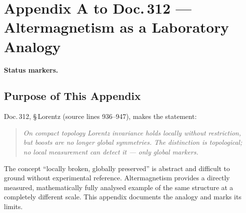 
\providecommand{\B}{}\renewcommand{\B}{\textbf{[B]}}
\providecommand{\K}{}\renewcommand{\K}{\textbf{[K]}}
\providecommand{\E}{}\renewcommand{\E}{\textbf{[E]}}
\providecommand{\SET}{}\renewcommand{\SET}{\textbf{[SETZUNG]}}


\chapter*{Appendix A to Doc.\,312 — Altermagnetism as a Laboratory Analogy}

\medskip\noindent\textbf{Status markers.}


\section*{Purpose of This Appendix}

Doc.\,312, §\,Lorentz (source lines 936--947), makes the statement:

\begin{quote}
\itshape
On compact topology Lorentz invariance holds locally without restriction,
but boosts are no longer global symmetries.
The distinction is topological; no local measurement can detect it —
only global markers.
\end{quote}

The concept \enquote{locally broken, globally preserved} is abstract and
difficult to ground without experimental reference. Altermagnetism
provides a directly measured, mathematically fully analysed example
of the same structure at a completely different scale. This appendix
documents the analogy and marks its limits.

